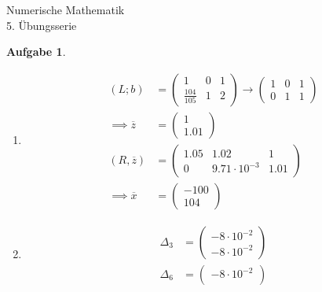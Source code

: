 \documentclass[11pt]{article}
\theoremstyle{break}
\newtheorem{task}{Aufgabe}
\newcommand{\hw}{5}
\begin{document}
\begin{center}
\Large{Numerische Mathematik}\\
\large{\hw. Übungsserie}
\end{center}
\begin{task}
    \hfill\vspace{-5mm}
    \begin{enumerate}[label={(\alph*)}]
        \item \hfill\vspace{-5mm}
        \begin{align*}
            (L;b) & = \left(\begin{array}{cc|c}
                1 & 0 & 1\\
                \frac{104}{105} & 1 & 2
            \end{array}\right)\rightarrow\left(\begin{array}{cc|c}
                1 & 0 & 1\\
                0 & 1 & 1
            \end{array}\right)\\
            \implies \overline{z} &= \begin{pmatrix}
                1\\
                1.01
            \end{pmatrix}\\
            (R,\overline{z}) &= \left(\begin{array}{cc|c}
                1.05 & 1.02 & 1\\
                0 & 9.71\cdot 10^{-3} & 1.01
            \end{array}\right)\\
            \implies \overline{x} &= \begin{pmatrix}
                -100\\
                104
            \end{pmatrix}
        \end{align*}
        \item \begin{align*}
            \Delta_3 &= \begin{pmatrix}
                -8\cdot 10^{-2}\\
                -8\cdot 10^{-2}
            \end{pmatrix}\\
            \Delta_6 &= \begin{pmatrix}
                -8\cdot 10^{-2}\\

\end{pmatrix}
\end{align*}
\end{enumerate}
\end{task}
\end{document}
